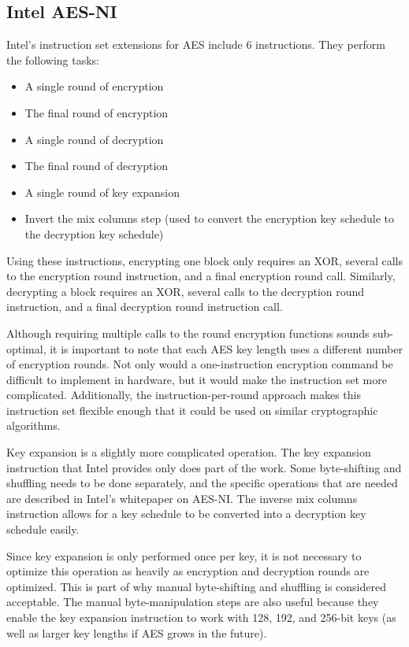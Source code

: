 \documentclass[a4paper,10pt]{article}
\begin{document}
\subsection{Intel AES-NI}

Intel's instruction set extensions for AES include 6 instructions\cite{intel}. They perform the following tasks:

\begin{itemize}
 \item A single round of encryption
 \item The final round of encryption
 \item A single round of decryption
 \item The final round of decryption
 \item A single round of key expansion
 \item Invert the mix columns step (used to convert the encryption key schedule to the decryption key schedule)
\end{itemize}

Using these instructions, encrypting one block only requires an XOR, several calls to the encryption round instruction, and a final encryption round call.  Similarly, decrypting a block requires an XOR, several calls to the decryption round instruction, and a final decryption round instruction call.

Although requiring multiple calls to the round encryption functions sounds sub-optimal, it is important to note that each AES key length uses a different number of encryption rounds.  Not only would a one-instruction encryption command be difficult to implement in hardware, but it would make the instruction set more complicated.  Additionally, the instruction-per-round approach makes this instruction set flexible enough that it could be used on similar cryptographic algorithms.

Key expansion is a slightly more complicated operation.  The key expansion instruction that Intel provides only does part of the work.  Some byte-shifting and shuffling needs to be done separately, and the specific operations that are needed are described in Intel's whitepaper on AES-NI.  The inverse mix columns instruction allows for a key schedule to be converted into a decryption key schedule easily.

Since key expansion is only performed once per key, it is not necessary to optimize this operation as heavily as encryption and decryption rounds are optimized.  This is part of why manual byte-shifting and shuffling is considered acceptable.  The manual byte-manipulation steps are also useful because they enable the key expansion instruction to work with 128, 192, and 256-bit keys (as well as larger key lengths if AES grows in the future).
\end{document}
